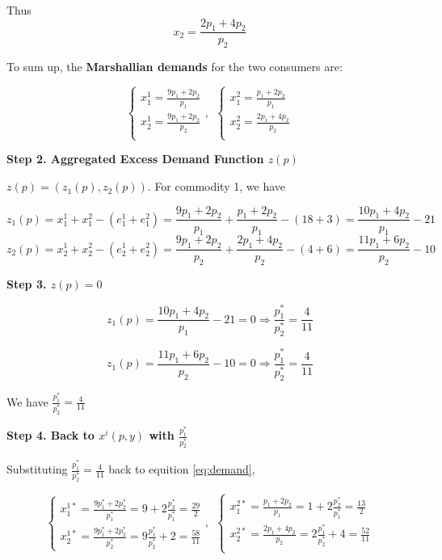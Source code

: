 \documentclass{article}
\begin{document}
Thus $$x_2 = \frac{2p_1+4p_2}{p_2}$$ 

To sum up, the \textbf{Marshallian demands} for the two consumers are:


\begin{equation}
    \begin{cases}
x^1_1 = \frac{9p_1+2p_2}{p_1} \\
x^1_2 = \frac{9p_1+2p_2}{p_2}  \\
    \end{cases}
, \ \
    \begin{cases}
x^2_1 = \frac{p_1+2p_2}{p_1} \\
x^2_2 = \frac{2p_1+4p_2}{p_2}  \\
    \end{cases}
\label{eq:demand}
\end{equation}

\vspace{3mm}

\textbf{Step 2. Aggregated Excess Demand Function $z(p)$}

\vspace{3mm}

$z(p) = (z_1(p),z_2(p))$. For commodity 1, we have

$$z_1(p) = x^1_1 + x^2_1 - (e^1_1 + e^2_1)= \frac{9p_1+2p_2}{p_1} + \frac{p_1+2p_2}{p_1} - (18 +3) = \frac{10p_1+4p_2}{p_1}-21 $$
$$z_2(p) = x^1_2 + x^2_2 - (e^1_2 + e^2_2) = \frac{9p_1+2p_2}{p_2}  + \frac{2p_1+4p_2}{p_2}  - (4+6) = \frac{11p_1+6p_2}{p_2} -10$$

\textbf{Step 3. $z(p) = 0$}


$$z_1(p) = \frac{10p_1+4p_2}{p_1}-21 =0 \Rightarrow \frac{p_1^*}{p_2^*} = \frac{4}{11}$$

$$z_1(p) = \frac{11p_1+6p_2}{p_2} -10 =0 \Rightarrow \frac{p_1^*}{p_2^*} = \frac{4}{11}$$


We have $\frac{p_1^*}{p_2^*} = \frac{4}{11}$

\textbf{Step 4. Back to $x^i(p,y)$ with $\frac{p_1^*}{p_2^*}$}


Substituting $\frac{p_1^*}{p_2^*} = \frac{4}{11}$ back to equition \ref{eq:demand},


\begin{equation}
    \begin{cases}
x^{1*}_1 = \frac{9p^*_1+2p^*_2}{p^*_1} = 9+ 2\frac{p_2^*}{p_1^*} = \frac{29}{2} \\
x^{1*}_2 = \frac{9p^*_1+2p^*_2}{p^*_2} = 9\frac{p_1^*}{p_2^*} +2 =
\frac{58}{11}    \end{cases}
, \ \
    \begin{cases}
x^{2*}_1 = \frac{p_1+2p_2}{p_1} =1 + 2\frac{p_2^*}{p_1^*} = \frac{13}{2} \\
x^{2*}_2 = \frac{2p_1+4p_2}{p_2} =  2\frac{p_1^*}{p_2^*} +4= \frac{52}{11}\\
    \end{cases}
\label{eq:wea}
\end{equation}
\end{document}
